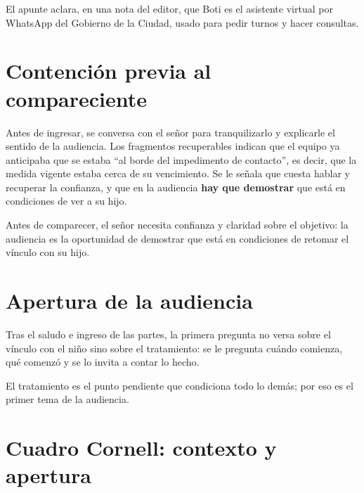 \documentclass[12pt,oneside]{book}
\begin{document}
\begin{note}
El apunte aclara, en una nota del editor, que Boti es el asistente virtual por WhatsApp del Gobierno de la Ciudad, usado para pedir turnos y hacer consultas.
\end{note}

\section{Contenci\'on previa al compareciente}

Antes de ingresar, se conversa con el se\~nor para tranquilizarlo y explicarle el sentido de la audiencia. Los fragmentos recuperables indican que el equipo ya anticipaba que se estaba ``al borde del impedimento de contacto'', es decir, que la medida vigente estaba cerca de su vencimiento. Se le se\~nala que cuesta hablar y recuperar la confianza, y que en la audiencia \textbf{hay que demostrar} que est\'a en condiciones de ver a su hijo.


\begin{important}
Antes de comparecer, el se\~nor necesita confianza y claridad sobre el objetivo: la audiencia es la oportunidad de demostrar que est\'a en condiciones de retomar el v\'inculo con su hijo.
\end{important}

\section{Apertura de la audiencia}

Tras el saludo e ingreso de las partes, la primera pregunta no versa sobre el v\'inculo con el ni\~no sino sobre el tratamiento: se le pregunta cu\'ando comienza, qu\'e comenz\'o y se lo invita a contar lo hecho.

\begin{important}
El tratamiento es el punto pendiente que condiciona todo lo dem\'as; por eso es el primer tema de la audiencia.
\end{important}

\section{Cuadro Cornell: contexto y apertura}
\end{document}
